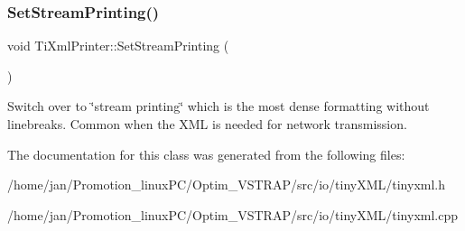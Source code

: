 \subsubsection{\texorpdfstring{Set\+Stream\+Printing()}{SetStreamPrinting()}}
{\footnotesize\ttfamily void Ti\+Xml\+Printer\+::\+Set\+Stream\+Printing (\begin{DoxyParamCaption}{ }\end{DoxyParamCaption})\hspace{0.3cm}{\ttfamily [inline]}}

Switch over to \char`\"{}stream printing\char`\"{} which is the most dense formatting without linebreaks. Common when the X\+ML is needed for network transmission. 

The documentation for this class was generated from the following files\+:\begin{DoxyCompactItemize}
\item 
/home/jan/\+Promotion\+\_\+linux\+P\+C/\+Optim\+\_\+\+V\+S\+T\+R\+A\+P/src/io/tiny\+X\+M\+L/tinyxml.\+h\item 
/home/jan/\+Promotion\+\_\+linux\+P\+C/\+Optim\+\_\+\+V\+S\+T\+R\+A\+P/src/io/tiny\+X\+M\+L/tinyxml.\+cpp\end{DoxyCompactItemize}
